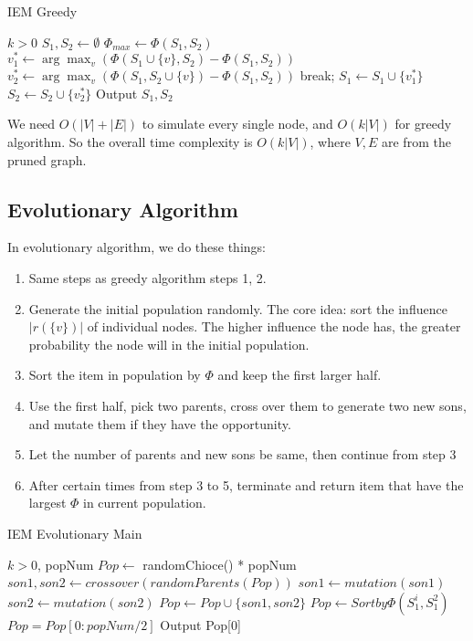 \documentclass{article}
\begin{document}
\begin{algorithm}
\caption{IEM Greedy}\label{alg:cap}
\begin{algorithmic}
\Require $k > 0$
\State $S_1, S_2 \gets \emptyset$
\State $\Phi_{max} \gets \Phi(S_1, S_2)$
\State $v^*_1 \gets \arg \max_v(\Phi(S_1 \cup \{v\}, S_2) - \Phi(S_1, S_2))$
\State $v^*_2 \gets \arg \max_v(\Phi(S_1, S_2 \cup \{v\}) - \Phi(S_1, S_2))$
    \State break;
    \State $S_1 \gets S_1 \cup \{v^*_1\}$
\Else
    \State $S_2\gets S_2 \cup \{v^*_2\}$
\EndIf
\EndWhile
\State Output $S_1, S_2$
\end{algorithmic}
\end{algorithm}

We need $O(|V|+|E|)$ to simulate every single node, and $O(k|V|)$ for greedy algorithm. So the overall time complexity is $O(k|V|)$, where $V, E$ are from the pruned graph.

\subsection{Evolutionary Algorithm}

In evolutionary algorithm, we do these things:


\begin{enumerate}
    \item Same steps as greedy algorithm steps 1, 2.
    \item Generate the initial population randomly. The core idea: sort the influence $|r(\{v\})|$ of individual nodes. The higher influence the node has, the greater probability the node will in the initial population.
    \item Sort the item in population by $\Phi$ and keep the first larger half.
    \item Use the first half, pick two parents, cross over them to generate two new sons, and mutate them if they have the opportunity.
    \item Let the number of parents and new sons be same, then continue from step 3
    \item After certain times from step 3 to 5, terminate and return item that have the largest $\Phi$ in current population.
\end{enumerate}


\begin{algorithm}
\caption{IEM Evolutionary Main}\label{alg:cap}
\begin{algorithmic}
\Require $k > 0$, popNum
\State $Pop \gets$ randomChioce() * popNum
        \State $son1, son2 \gets crossover(randomParents(Pop))$
        \State $son1 \gets mutation(son1)$
        \State $son2 \gets mutation(son2)$
        \State $Pop \gets Pop \cup \{son1, son2\}$
    \EndFor
    \State $Pop \gets Sort by \Phi(S^i_1, S^2_1)$
    \State $Pop = Pop[0: popNum/2]$
\EndFor
\State Output Pop[0]
\end{algorithmic}
\end{algorithm}
\end{document}
